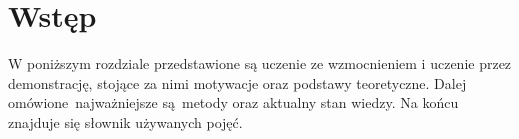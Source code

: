 \section{Wstęp}
W poniższym rozdziale przedstawione są uczenie ze wzmocnieniem i uczenie przez demonstrację, stojące za nimi motywacje oraz podstawy teoretyczne. Dalej omówione najważniejsze są metody oraz aktualny stan wiedzy. Na końcu znajduje się słownik używanych pojęć.
